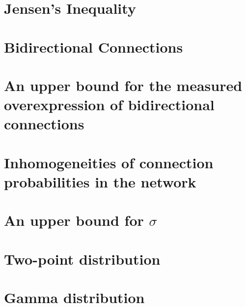 \documentclass{scrreprt}
\begin{document}
  

\section{Jensen's Inequality}

  

\section{Bidirectional Connections}

  

\section{An upper bound for the measured overexpression of bidirectional connections}

  

\section{Inhomogeneities of connection probabilities in the network}



\section{An upper bound for $\sigma$}

  
  
\section{Two-point distribution}

    

  
\section{Gamma distribution}

  
\end{document}

